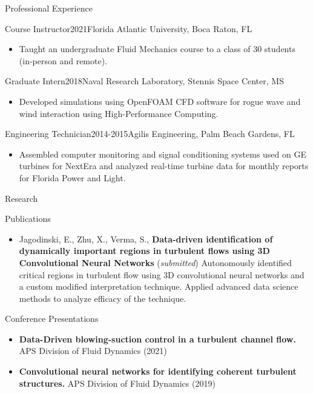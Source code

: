 \documentclass[]{mcdowellcv}
\begin{document}
	\begin{cvsection}{Professional Experience}
		\begin{cvsubsection}{Course Instructor}{}{2021}{Florida Atlantic University, Boca Raton, FL}
			\begin{itemize} 
			\item Taught an undergraduate Fluid Mechanics course to a class of 30 students (in-person and remote).
			\end{itemize}
		\end{cvsubsection}
		
		\begin{cvsubsection}{Graduate Intern}{}{2018}{Naval Research Laboratory, Stennis Space Center, MS}
			\begin{itemize}
            	\item Developed simulations using OpenFOAM CFD software for rogue wave and wind interaction using High-Performance Computing.
			\end{itemize}
		\end{cvsubsection}
		
			\begin{cvsubsection}{Engineering Technician}{}{2014-2015}{Agilis Engineering, Palm Beach Gardens, FL}
			\begin{itemize}
            	\item Assembled computer monitoring and signal conditioning systems used on GE turbines for NextEra and analyzed real-time turbine data for monthly reports for Florida Power and Light.
			\end{itemize}
		\end{cvsubsection}
	\end{cvsection}
	
		\begin{cvsection}{Research}
		\begin{cvsubsection}{Publications}{}{}
			\begin{itemize}
				\item Jagodinski, E., Zhu, X., Verma, S., \textbf{Data-driven identification of dynamically important regions in turbulent flows using 3D Convolutional Neural Networks} (\textit{submitted})  Autonomously identified critical regions in turbulent flow using 3D convolutional neural networks and a custom modified interpretation technique. Applied advanced data science methods to analyze efficacy of the technique.
			\end{itemize}
		\end{cvsubsection}
		
		\begin{cvsubsection}{Conference Presentations}{}{}
			\begin{itemize}
				\item  \textbf{Data-Driven blowing-suction control in a turbulent channel flow.}  APS Division of Fluid Dynamics (2021)
				\item \textbf{Convolutional neural networks for identifying coherent turbulent structures.} APS Division of Fluid Dynamics (2019)
			\end{itemize}
		\end{cvsubsection}
	\end{cvsection}
	
\end{document}
